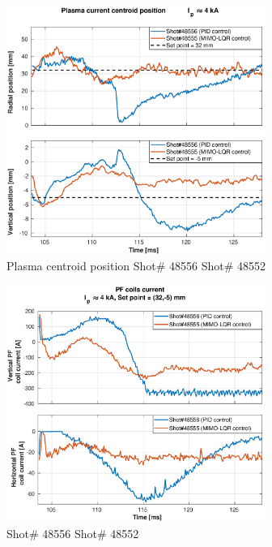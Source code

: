\begin{figure}
	\centering
	\includegraphics[width=0.75\textwidth]{Chp5/PIDvsMIMO_556_555_2.eps}
	\caption{Plasma centroid position  Shot\# 48556 Shot\# 48552}
\end{figure}

\begin{figure}
	\centering
	\includegraphics[width=0.75\textwidth]{Chp5/PIDvsMIMO_556_555_curr_2.eps}
	\caption{  Shot\# 48556 Shot\# 48552}
\end{figure}

